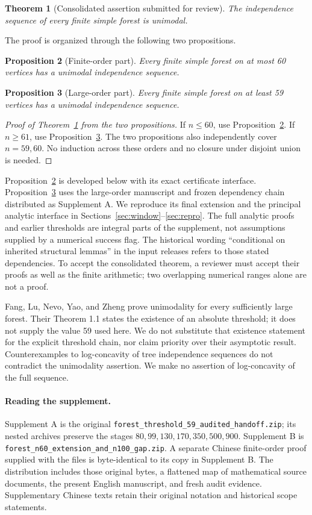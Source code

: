 \documentclass[11pt,a4paper]{article}
\newtheorem{theorem}{Theorem}[section]
\newtheorem{proposition}[theorem]{Proposition}
\theoremstyle{definition}\newtheorem{definition}[theorem]{Definition}
\theoremstyle{remark}\newtheorem{remark}[theorem]{Remark}
\begin{document}
\begin{theorem}[Consolidated assertion submitted for review]\label{thm:all}
The independence sequence of every finite simple forest is unimodal.
\end{theorem}
The proof is organized through the following two propositions.
\begin{proposition}[Finite-order part]\label{prop:finite}
Every finite simple forest on at most 60 vertices has a unimodal independence sequence.
\end{proposition}
\begin{proposition}[Large-order part]\label{prop:large}
Every finite simple forest on at least 59 vertices has a unimodal independence sequence.
\end{proposition}
\begin{proof}[Proof of Theorem~\ref{thm:all} from the two propositions]
If $n\le60$, use Proposition~\ref{prop:finite}. If $n\ge61$, use Proposition~\ref{prop:large}. The two propositions also independently cover $n=59,60$. No induction across these orders and no closure under disjoint union is needed.
\end{proof}

Proposition~\ref{prop:finite} is developed below with its exact certificate interface. Proposition~\ref{prop:large} uses the large-order manuscript and frozen dependency chain distributed as Supplement A. We reproduce its final extension and the principal analytic interface in Sections~\ref{sec:window}--\ref{sec:repro}. The full analytic proofs and earlier thresholds are integral parts of the supplement, not assumptions supplied by a numerical success flag. The historical wording ``conditional on inherited structural lemmas'' in the input releases refers to those stated dependencies. To accept the consolidated theorem, a reviewer must accept their proofs as well as the finite arithmetic; two overlapping numerical ranges alone are not a proof.

Fang, Lu, Nevo, Yao, and Zheng \cite{fang} prove unimodality for every sufficiently large forest. Their Theorem 1.1 states the existence of an absolute threshold; it does not supply the value 59 used here. We do not substitute that existence statement for the explicit threshold chain, nor claim priority over their asymptotic result. Counterexamples to log-concavity of tree independence sequences \cite{kadrawi,ramos} do not contradict the unimodality assertion. We make no assertion of log-concavity of the full sequence.

\paragraph{Reading the supplement.}
Supplement A is the original \nolinkurl{forest_threshold_59_audited_handoff.zip}; its nested archives preserve the stages $80,99,130,170,350,500,900$. Supplement B is \nolinkurl{forest_n60_extension_and_n100_gap.zip}. A separate Chinese finite-order proof supplied with the files is byte-identical to its copy in Supplement B. The distribution includes those original bytes, a flattened map of mathematical source documents, the present English manuscript, and fresh audit evidence. Supplementary Chinese texts retain their original notation and historical scope statements.
\end{document}
